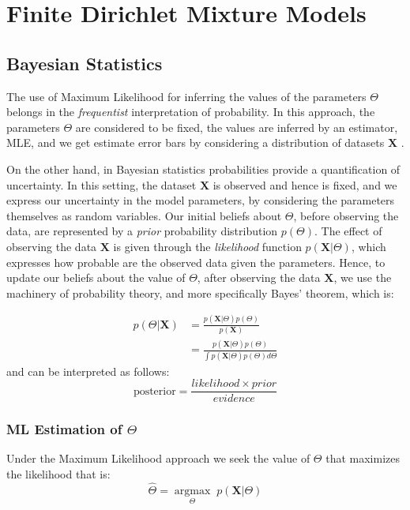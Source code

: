 \section{Finite Dirichlet Mixture Models} \label{fdmm-s}

\subsection{Bayesian Statistics}
The use of Maximum Likelihood for inferring the values of the parameters $\Theta$ belongs in the \emph{frequentist} interpretation of probability. In this approach, the parameters $\Theta$ are considered to be fixed, the values are inferred by an estimator, \eg MLE, and we get estimate error bars by considering a distribution of datasets $\mathbf{X}$ \cite[Ch. 1]{Bishop2006}. 

On the other hand, in Bayesian statistics probabilities provide a quantification of uncertainty. In this setting, the dataset $\mathbf{X}$ is observed and hence is fixed, and we express our uncertainty in the model parameters, by considering the parameters themselves as random variables. Our initial beliefs about $\Theta$, before observing the data, are represented by a \emph{prior} probability distribution $p(\Theta)$. The effect of observing the data $\mathbf{X}$ is given through the \emph{likelihood} function $p(\mathbf{X}|\Theta)$, which expresses how probable are the observed data given the parameters. Hence, to update our beliefs about the value of $\Theta$, after observing the data $\mathbf{X}$, we use the machinery of probability theory, and more specifically Bayes' theorem, which is:

\begin{equation}
  \begin{aligned}
	p(\Theta | \mathbf{X}) & = \frac{p(\mathbf{X}|\Theta) p(\Theta)}{p(\mathbf{X})} \\
	& = \frac{p(\mathbf{X}|\Theta) p(\Theta)}{\int p(\mathbf{X}|\Theta) p(\Theta) d\Theta}
  \end{aligned}
\end{equation}
and can be interpreted as follows:
\begin{equation}
	\text{posterior} = \frac{likelihood \times prior}{evidence}
\end{equation}

\subsubsection*{ML Estimation of $\Theta$}
Under the Maximum Likelihood approach we seek the value of $\Theta$ that maximizes the likelihood that is:
\begin{equation} \label{MLE-f-bayes}
	\hat{\Theta} =  \underset{\Theta}{\operatorname{argmax}} \; p(\mathbf{X}|\Theta)
\end{equation}

